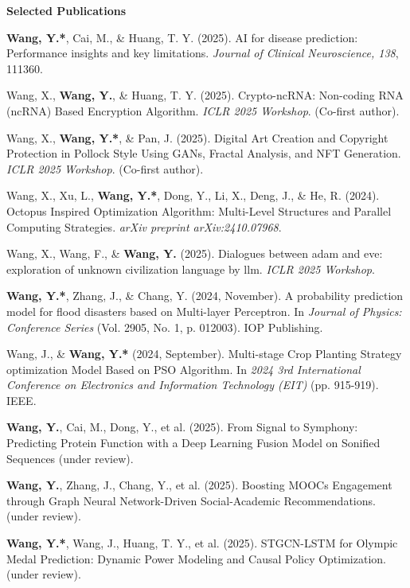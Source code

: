 \documentclass[11pt]{article}
\begin{document}
	\begin{center}
		\textbf{\large Selected Publications}
	\end{center}
	\begin{enumerate}[noitemsep, topsep=0pt, partopsep=0pt, parsep=0pt, leftmargin=*, label={[\arabic*]}]
		\item \textbf{Wang, Y.*}, Cai, M., \& Huang, T. Y. (2025). AI for disease prediction: Performance insights and key limitations. \textit{Journal of Clinical Neuroscience, 138}, 111360.
		\item Wang, X., \textbf{Wang, Y.}, \& Huang, T. Y. (2025). Crypto-ncRNA: Non-coding RNA (ncRNA) Based Encryption Algorithm. \textit{ICLR 2025 Workshop}. (Co-first author).
		\item Wang, X., \textbf{Wang, Y.*}, \& Pan, J. (2025). Digital Art Creation and Copyright Protection in Pollock Style Using GANs, Fractal Analysis, and NFT Generation. \textit{ICLR 2025 Workshop}. (Co-first author).
		\item Wang, X., Xu, L., \textbf{Wang, Y.*}, Dong, Y., Li, X., Deng, J., \& He, R. (2024). Octopus Inspired Optimization Algorithm: Multi-Level Structures and Parallel Computing Strategies. \textit{arXiv preprint arXiv:2410.07968}.
		\item Wang, X., Wang, F., \& \textbf{Wang, Y.} (2025). Dialogues between adam and eve: exploration of unknown civilization language by llm. \textit{ICLR 2025 Workshop}.
		\item \textbf{Wang, Y.*}, Zhang, J., \& Chang, Y. (2024, November). A probability prediction model for flood disasters based on Multi-layer Perceptron. In \textit{Journal of Physics: Conference Series} (Vol. 2905, No. 1, p. 012003). IOP Publishing.
		\item Wang, J., \& \textbf{Wang, Y.*} (2024, September). Multi-stage Crop Planting Strategy optimization Model Based on PSO Algorithm. In \textit{2024 3rd International Conference on Electronics and Information Technology (EIT)} (pp. 915-919). IEEE.
		\item \textbf{Wang, Y.}, Cai, M., Dong, Y., et al. (2025). From Signal to Symphony: Predicting Protein Function with a Deep Learning Fusion Model on Sonified Sequences (under review).
		\item \textbf{Wang, Y.}, Zhang, J., Chang, Y., et al. (2025). Boosting MOOCs Engagement through Graph Neural Network-Driven Social-Academic Recommendations. (under review).
		\item \textbf{Wang, Y.*}, Wang, J., Huang, T. Y., et al. (2025). STGCN-LSTM for Olympic Medal Prediction: Dynamic Power Modeling and Causal Policy Optimization.  (under review).
	\end{enumerate}
	
\end{document}
